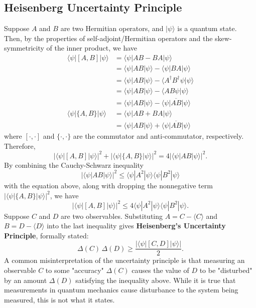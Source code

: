 \documentclass{article}
\theoremstyle{definition}
\begin{document}
\subsection*{Heisenberg Uncertainty Principle}
Suppose $A$ and $B$ are two Hermitian operators, and $|\psi \rangle$ is a quantum state. Then, by the properties of self-adjoint/Hermitian operators and the skew-symmetricity of the inner product, we have
\begin{align*}
    \langle \psi | [A, B] | \psi \rangle & = \langle \psi | AB - BA | \psi \rangle \\
    & = \langle \psi | AB | \psi \rangle - \langle \psi | BA | \psi \rangle \\
    & = \langle \psi | AB | \psi \rangle - \langle A^\dagger B^\dagger \psi | \psi \rangle \\
    & = \langle \psi | AB | \psi \rangle - \langle A B \psi | \psi \rangle \\
    & = \langle \psi | AB | \psi \rangle - \overline{\langle \psi | AB  | \psi \rangle} \\
    \langle \psi | \{A, B\} | \psi \rangle & = \langle \psi | AB + BA | \psi \rangle \\
    & = \langle \psi | AB | \psi \rangle + \overline{\langle \psi | AB  | \psi \rangle}
\end{align*}
where $[\cdot, \cdot]$ and $\{ \cdot, \cdot \}$ are the commutator and anti-commutator, respectively. Therefore,
\[| \langle \psi | [A, B] | \psi\rangle|^2 + | \langle \psi | \{A, B\}| \psi \rangle|^2 = 4|\langle \psi | AB | \psi \rangle |^2.\]
By combining the Cauchy-Schwarz inequality
\[|\langle \psi | AB | \psi \rangle|^2 \leq \langle \psi | A^2 | \psi \rangle \langle \psi | B^2 | \psi \rangle\]
with the equation above, along with dropping the nonnegative term $| \langle \psi | \{A, B\}| \psi \rangle|^2$, we have
\[|\langle \psi| [A, B] | \psi \rangle |^2 \leq 4 \langle \psi | A^2 | \psi \rangle \langle \psi | B^2 | \psi \rangle.\]
Suppose $C$ and $D$ are two observables. Substituting $A = C - \langle C \rangle$ and $B = D - \langle D \rangle$ into the last inequality gives \textbf{Heisenberg's Uncertainty Principle}, formally stated:
\[\Delta (C) \, \Delta (D) \geq \frac{|\langle \psi |[C, D] | \psi \rangle|}{2}.\]
A common misinterpretation of the uncertainty principle is that measuring an observable $C$ to some "accuracy" $\Delta (C)$ causes the value of $D$ to be "disturbed" by an amount $\Delta (D)$ satisfying the inequality above. While it is true that measurements in quantum mechanics cause disturbance to the system being measured, this is not what it states.
\end{document}
